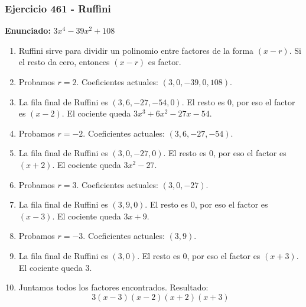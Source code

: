 \documentclass[11pt,a4paper]{article}
\begin{document}
\subsubsection*{Ejercicio 461 - Ruffini}
\textbf{Enunciado:} $ 3 x^{4} - 39 x^{2} + 108 $\par
\begin{enumerate}[leftmargin=2em]
\item Ruffini sirve para dividir un polinomio entre factores de la forma \((x-r)\). Si el resto da cero, entonces \((x-r)\) es factor.
\item Probamos \(r=2\). Coeficientes actuales: \((3, 0, -39, 0, 108)\).
\item La fila final de Ruffini es \((3, 6, -27, -54, 0)\). El resto es \(0\), por eso el factor es \((x-2)\). El cociente queda \(3 x^{3} + 6 x^{2} - 27 x - 54\).
\item Probamos \(r=-2\). Coeficientes actuales: \((3, 6, -27, -54)\).
\item La fila final de Ruffini es \((3, 0, -27, 0)\). El resto es \(0\), por eso el factor es \((x+2)\). El cociente queda \(3 x^{2} - 27\).
\item Probamos \(r=3\). Coeficientes actuales: \((3, 0, -27)\).
\item La fila final de Ruffini es \((3, 9, 0)\). El resto es \(0\), por eso el factor es \((x-3)\). El cociente queda \(3 x + 9\).
\item Probamos \(r=-3\). Coeficientes actuales: \((3, 9)\).
\item La fila final de Ruffini es \((3, 0)\). El resto es \(0\), por eso el factor es \((x+3)\). El cociente queda \(3\).
\item Juntamos todos los factores encontrados. Resultado: \[\boxed{3 \left(x - 3\right) \left(x - 2\right) \left(x + 2\right) \left(x + 3\right)}\]
\end{enumerate}

\vspace{0.2cm}
\end{document}
